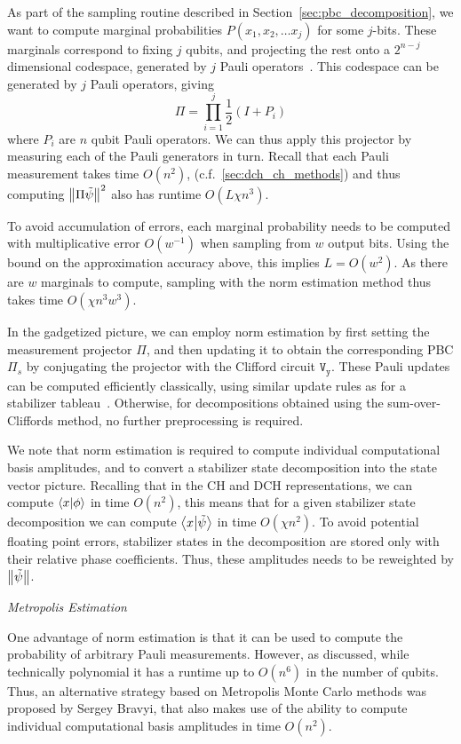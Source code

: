As part of the sampling routine described in Section~\ref{sec:pbc_decomposition}, we want to compute marginal probabilities $P\left(x_{1},x_{2},\dots x_{j}\right)$ for some $j$-bits. These marginals correspond to fixing $j$ qubits, and projecting the rest onto a $2^{n-j}$ dimensional codespace, generated by $j$ Pauli operators~\cite{Bravyi2016}. This codespace can be generated by $j$ Pauli operators, giving
\[\Pi = \prod_{i=1}^{j}\frac{1}{2}\left(I+P_{i}\right)\]
where $P_{i}$ are $n$ qubit Pauli operators. We can thus apply this projector by measuring each of the Pauli generators in turn. Recall that each Pauli measurement takes time $O(n^{2})$, (c.f.~\ref{sec:dch_ch_methods}) and thus computing $\norm{\Pi\tilde{\psi}}^{2}$ also has runtime $O\left(L\chi n^{3}\right)$.\par
To avoid accumulation of errors, each marginal probability needs to be computed with multiplicative error $O(w^{-1})$ when sampling from $w$ output bits. Using the bound on the approximation accuracy above, this implies $L=O(w^{2})$. As there are $w$ marginals to compute, sampling with the norm estimation method thus takes time $O(\chi n^{3}w^{3})$.\par
In the gadgetized picture, we can employ norm estimation by first setting the measurement projector $\Pi$, and then updating it to obtain the corresponding PBC $\Pi_{s}$ by conjugating the projector with the Clifford circuit $\mathtt{V_{y}}$. These Pauli updates can be computed efficiently classically, using similar update rules as for a stabilizer tableau~\cite{Aaronson2004}. Otherwise, for decompositions obtained using the sum-over-Cliffords method, no further preprocessing is required.\par
We note that norm estimation is required to compute individual computational basis amplitudes, and to convert a stabilizer state decomposition into the state vector picture. Recalling that in the CH and DCH representations, we can compute $\braket{x}{\phi}$ in time $O(n^{2})$, this means that for a given stabilizer state decomposition we can compute $\braket{x}{\tilde{\psi}}$ in time $O(\chi n^{2})$. To avoid potential floating point errors, stabilizer states in the decomposition are stored only with their relative phase coefficients. Thus, these amplitudes needs to be reweighted by $\norm{\tilde{\psi}}$.\par
\large{\itshape{Metropolis Estimation}}\par
One advantage of norm estimation is that it can be used to compute the probability of arbitrary Pauli measurements. However, as discussed, while technically polynomial it has a runtime up to $O(n^{6})$ in the number of qubits. Thus, an alternative strategy based on Metropolis Monte Carlo methods was proposed by Sergey Bravyi, that also makes use of the ability to compute individual computational basis amplitudes in time $O(n^{2})$.\par
